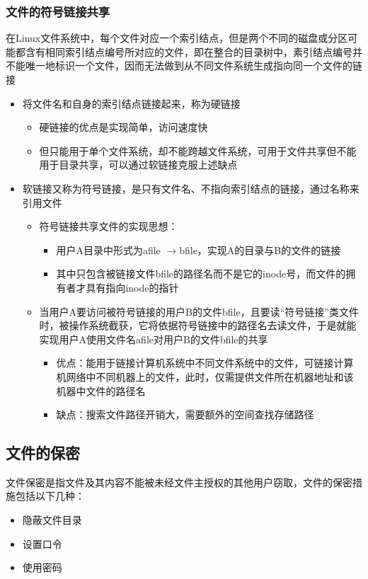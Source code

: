 \documentclass[cs4size,a4paper,10pt]{ctexart}
\begin{document}
	\subsubsection{文件的符号链接共享}
	在Linux文件系统中，每个文件对应一个索引结点，但是两个不同的磁盘或分区可能都含有相同索引结点编号所对应的文件，即在整合的目录树中，素引结点编号并不能唯一地标识一个文件，因而无法做到从不同文件系统生成指向同一个文件的链接
	\begin{itemize}
		\item 将文件名和自身的索引结点链接起来，称为硬链接
		\begin{itemize}
			\item 硬链接的优点是实现简单，访问速度快
			\item 但只能用于单个文件系统，却不能跨越文件系统，可用于文件共享但不能用于目录共享，可以通过软链接克服上述缺点
		\end{itemize}
		\item 软链接又称为符号链接，是只有文件名、不指向索引结点的链接，通过名称来引用文件
		\begin{itemize}
			\item 符号链接共享文件的实现思想：
			\begin{itemize}
				\item 用户A目录中形式为afile $\rightarrow$bfile，实现A的目录与B的文件的链接
				\item 其中只包含被链接文件bfile的路径名而不是它的inode号，而文件的拥有者才具有指向inode的指针
			\end{itemize}
			\item 当用户A要访问被符号链接的用户B的文件bfile，且要读“符号链接”类文件时，被操作系统截获，它将依据符号链接中的路径名去读文件，于是就能实现用户A使用文件名afile对用户B的文件bfile的共享
			\begin{itemize}
				\item 优点：能用于链接计算机系统中不同文件系统中的文件，可链接计算机网络中不同机器上的文件，此时，仅需提供文件所在机器地址和该机器中文件的路径名
				\item 缺点：搜索文件路径开销大，需要额外的空间查找存储路径
			\end{itemize}
		\end{itemize}
	\end{itemize}


	\subsection{文件的保密}
	文件保密是指文件及其内容不能被未经文件主授权的其他用户窃取，文件的保密措施包括以下几种：
	\begin{itemize}
		\item 隐蔽文件目录
		\item 设置口令
		\item 使用密码
	\end{itemize}
\end{document}
